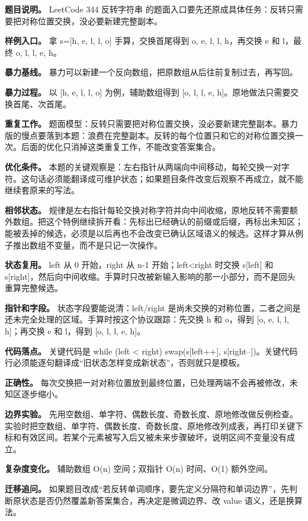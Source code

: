 \textbf{题目说明。} LeetCode 344 反转字符串 的题面入口要先还原成具体任务：反转只需要把对称位置交换，没必要新建完整副本。

\textbf{样例入口。} 拿 s=[h, e, l, l, o] 手算，交换首尾得到 o, e, l, l, h，再交换 e 和 l，最终 o, l, l, e, h。

\textbf{暴力基线。} 暴力可以新建一个反向数组，把原数组从后往前复制过去，再写回。

\textbf{暴力过程。} 以 [h, e, l, l, o] 为例，辅助数组得到 [o, l, l, e, h]。原地做法只需要交换首尾、次首尾。

\textbf{重复工作。} 题面模型：反转只需要把对称位置交换，没必要新建完整副本。暴力版的慢点要落到本题：浪费在完整副本。反转的每个位置只和它的对称位置交换一次。后面的优化只消掉这类重复工作，不能改变答案集合。

\textbf{优化条件。} 本题的关键观察是：左右指针从两端向中间移动，每轮交换一对字符。这句话必须能翻译成可维护状态；如果题目条件改变后观察不再成立，就不能继续套原来的写法。

\textbf{相邻状态。} 规律是左右指针每轮交换对称字符并向中间收缩，原地反转不需要额外数组。把这个特例继续拆开看：先标出已经确认的前缀或后缀，再标出未知区；能被丢掉的候选，必须是以后再也不会改变已确认区域语义的候选。这样才算从例子推出数组不变量，而不是只记一次操作。

\textbf{状态复用。} left 从 0 开始，right 从 n-1 开始；left<right 时交换 s[left] 和 s[right]，然后向中间收缩。手算时只改被新输入影响的那一小部分，而不是回头重算完整候选。

\textbf{指针和字段。} 状态字段要能说清：left/right 是尚未交换的对称位置，二者之间是还未完全处理的区域。手算时按这个协议跟踪：先交换 h 和 o，得到 [o, e, l, l, h]；再交换 e 和 l，得到 [o, l, l, e, h]。

\textbf{代码落点。} 关键代码是 while (left < right) swap(s[left++], s[right--])。关键代码行必须能逐句翻译成“旧状态怎样变成新状态”，否则就只是模板。

\textbf{正确性。} 每次交换把一对对称位置放到最终位置，已处理两端不会再被修改，未知区逐步缩小。

\textbf{边界实验。} 先用空数组、单字符、偶数长度、奇数长度、原地修改做反例检查。实验时把空数组、单字符、偶数长度、奇数长度、原地修改列成表，再打印关键下标和有效区间。若某个元素被写入后又被未来步骤破坏，说明区间不变量没有成立。

\textbf{复杂度变化。} 辅助数组 O(n) 空间；双指针 O(n) 时间、O(1) 额外空间。

\textbf{迁移追问。} 如果题目改成“若反转单词顺序，要先定义分隔符和单词边界”，先判断原状态是否仍然覆盖新答案集合，再决定是微调边界、改 value 语义，还是换算法。

